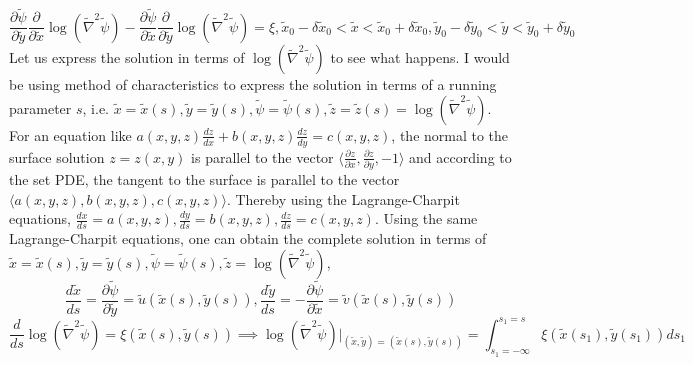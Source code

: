 \documentclass{article}
\begin{document}
\begin{equation*}
\frac{\partial \tilde{\psi}}{\partial \tilde{y}} \frac{\partial}{\partial \tilde{x}}\operatorname{log}(\tilde{\nabla}^2 \tilde{\psi}) - \frac{\partial \tilde{\psi}}{\partial \tilde{x}} \frac{\partial}{\partial \tilde{y}}\operatorname{log}(\tilde{\nabla}^2 \tilde{\psi}) = \xi, \tilde{x}_0-\delta\tilde{x}_0 < \tilde{x} < \tilde{x}_0 + \delta \tilde{x}_0, \tilde{y}_0-\delta\tilde{y}_0 < \tilde{y} < \tilde{y}_0 + \delta \tilde{y}_0
\end{equation*}
Let us express the solution in terms of $\operatorname{log}(\tilde{\nabla}^2 \tilde{\psi})$ to see what happens. I would be using method of characteristics to express the solution in terms of a running parameter $s$, i.e. $\tilde{x} = \tilde{x}(s), \tilde{y} = \tilde{y}(s), \tilde{\psi} = \tilde{\psi}(s), \tilde{z} = \tilde{z}(s) = \operatorname{log}(\tilde{\nabla}^2 \tilde{\psi})$. For an equation like $a(x, y, z)\frac{dz}{dx}+b(x,y,z)\frac{dz}{dy}=c(x,y,z)$, the normal to the surface solution $z = z(x, y)$ is parallel to the vector $\langle\frac{\partial z}{\partial x},\frac{\partial z}{\partial y},-1\rangle$ and according to the set PDE, the tangent to the surface is parallel to the vector $\langle a(x, y, z), b(x, y, z), c(x, y, z)\rangle$. Thereby using the Lagrange-Charpit equations, $\frac{dx}{ds} = a(x, y, z), \frac{d y}{d s} = b(x, y, z), \frac{d z}{d s} = c(x, y, z)$. Using the same Lagrange-Charpit equations, one can obtain the complete solution in terms of $\tilde{x} = \tilde{x}(s), \tilde{y} = \tilde{y}(s), \tilde{\psi} = \tilde{\psi}(s), \tilde{z} = \operatorname{log}(\tilde{\nabla}^2 \tilde{\psi})$,
\begin{equation*}
\frac{d \tilde{x}}{d s} = \frac{\partial \tilde{\psi}}{\partial \tilde{y}} = \tilde{u}(\tilde{x}(s),\tilde{y}(s)), \frac{d \tilde{y}}{d s} = -\frac{\partial \tilde{\psi}}{\partial \tilde{x}} = \tilde{v}(\tilde{x}(s),\tilde{y}(s))
\end{equation*}
\begin{equation}
\frac{d}{d s}\operatorname{log}(\tilde{\nabla}^2 \tilde{\psi}) = \xi(\tilde{x}(s),\tilde{y}(s)) \implies \operatorname{log}(\tilde{\nabla}^2 \tilde{\psi})|_{(\tilde{x},\tilde{y})=(\tilde{x}(s),\tilde{y}(s))} = \int_{s_1=-\infty}^{s_1=s} \xi(\tilde{x}(s_1),\tilde{y}(s_1))  ds_1
\end{equation}
\end{document}
